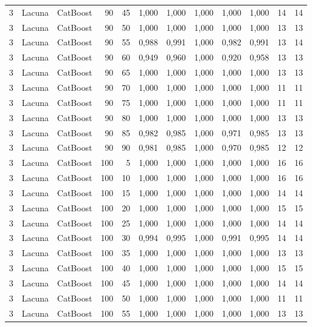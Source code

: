\begin{longtable}{@{}rllrrrrrrrrr@{}}
3 & Lacuna & CatBoost & 90 & 45 & 1,000 & 1,000 & 1,000 & 1,000 & 1,000 & 14 & 14 \\
3 & Lacuna & CatBoost & 90 & 50 & 1,000 & 1,000 & 1,000 & 1,000 & 1,000 & 13 & 13 \\
3 & Lacuna & CatBoost & 90 & 55 & 0,988 & 0,991 & 1,000 & 0,982 & 0,991 & 13 & 14 \\
3 & Lacuna & CatBoost & 90 & 60 & 0,949 & 0,960 & 1,000 & 0,920 & 0,958 & 13 & 13 \\
3 & Lacuna & CatBoost & 90 & 65 & 1,000 & 1,000 & 1,000 & 1,000 & 1,000 & 13 & 13 \\
3 & Lacuna & CatBoost & 90 & 70 & 1,000 & 1,000 & 1,000 & 1,000 & 1,000 & 11 & 11 \\
3 & Lacuna & CatBoost & 90 & 75 & 1,000 & 1,000 & 1,000 & 1,000 & 1,000 & 11 & 11 \\
3 & Lacuna & CatBoost & 90 & 80 & 1,000 & 1,000 & 1,000 & 1,000 & 1,000 & 13 & 13 \\
3 & Lacuna & CatBoost & 90 & 85 & 0,982 & 0,985 & 1,000 & 0,971 & 0,985 & 13 & 13 \\
3 & Lacuna & CatBoost & 90 & 90 & 0,981 & 0,985 & 1,000 & 0,970 & 0,985 & 12 & 12 \\
3 & Lacuna & CatBoost & 100 & 5 & 1,000 & 1,000 & 1,000 & 1,000 & 1,000 & 16 & 16 \\
3 & Lacuna & CatBoost & 100 & 10 & 1,000 & 1,000 & 1,000 & 1,000 & 1,000 & 16 & 16 \\
3 & Lacuna & CatBoost & 100 & 15 & 1,000 & 1,000 & 1,000 & 1,000 & 1,000 & 14 & 14 \\
3 & Lacuna & CatBoost & 100 & 20 & 1,000 & 1,000 & 1,000 & 1,000 & 1,000 & 15 & 15 \\
3 & Lacuna & CatBoost & 100 & 25 & 1,000 & 1,000 & 1,000 & 1,000 & 1,000 & 14 & 14 \\
3 & Lacuna & CatBoost & 100 & 30 & 0,994 & 0,995 & 1,000 & 0,991 & 0,995 & 14 & 14 \\
3 & Lacuna & CatBoost & 100 & 35 & 1,000 & 1,000 & 1,000 & 1,000 & 1,000 & 13 & 13 \\
3 & Lacuna & CatBoost & 100 & 40 & 1,000 & 1,000 & 1,000 & 1,000 & 1,000 & 15 & 15 \\
3 & Lacuna & CatBoost & 100 & 45 & 1,000 & 1,000 & 1,000 & 1,000 & 1,000 & 14 & 14 \\
3 & Lacuna & CatBoost & 100 & 50 & 1,000 & 1,000 & 1,000 & 1,000 & 1,000 & 11 & 11 \\
3 & Lacuna & CatBoost & 100 & 55 & 1,000 & 1,000 & 1,000 & 1,000 & 1,000 & 13 & 13 \\

\end{longtable}
